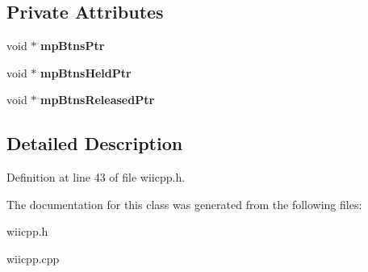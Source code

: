 \subsection*{Private Attributes}
\begin{DoxyCompactItemize}
\item 
\hypertarget{class_c_button_base_ac15590c3755869ab95aac1716e2f83b7}{void $\ast$ {\bfseries mp\-Btns\-Ptr}}\label{class_c_button_base_ac15590c3755869ab95aac1716e2f83b7}

\item 
\hypertarget{class_c_button_base_ab8c2766f06261ea74a6d8ae3f7cf52dd}{void $\ast$ {\bfseries mp\-Btns\-Held\-Ptr}}\label{class_c_button_base_ab8c2766f06261ea74a6d8ae3f7cf52dd}

\item 
\hypertarget{class_c_button_base_a8d064f3dc6b97b1b53067e4f35bd6367}{void $\ast$ {\bfseries mp\-Btns\-Released\-Ptr}}\label{class_c_button_base_a8d064f3dc6b97b1b53067e4f35bd6367}

\end{DoxyCompactItemize}


\subsection{Detailed Description}


Definition at line 43 of file wiicpp.\-h.



The documentation for this class was generated from the following files\-:\begin{DoxyCompactItemize}
\item 
wiicpp.\-h\item 
wiicpp.\-cpp\end{DoxyCompactItemize}
